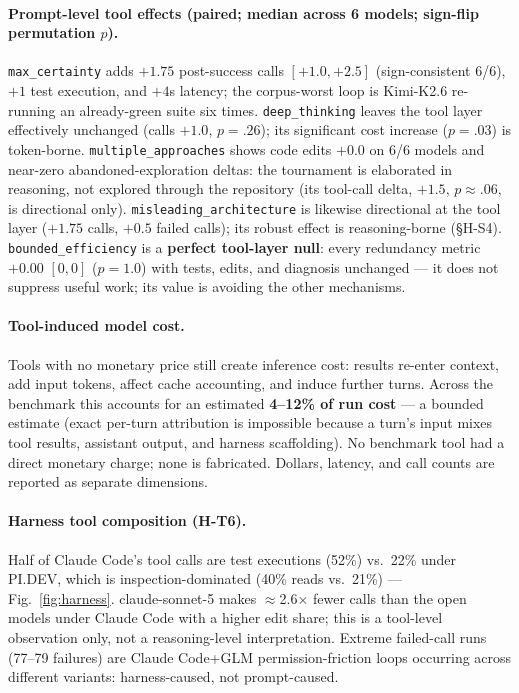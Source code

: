 \documentclass[11pt]{article}
\newcommand{\pidev}{PI.DEV}
\newcommand{\cc}{Claude Code}
\newcommand{\xd}{$\times$}
\begin{document}
\paragraph{Prompt-level tool effects (paired; median across 6 models;
sign-flip permutation $p$).} \texttt{max\_certainty} adds $+1.75$
post-success calls $[+1.0,+2.5]$ (sign-consistent 6/6), $+1$ test
execution, and $+4$s latency; the corpus-worst loop is Kimi-K2.6
re-running an already-green suite six times. \texttt{deep\_thinking}
leaves the tool layer effectively unchanged (calls $+1.0$, $p=.26$); its
significant cost increase ($p=.03$) is token-borne.
\texttt{multiple\_approaches} shows code edits $+0.0$ on 6/6 models and
near-zero abandoned-exploration deltas: the tournament is elaborated in
reasoning, not explored through the repository (its tool-call delta,
$+1.5$, $p\approx.06$, is directional only). \texttt{misleading\_architecture}
is likewise directional at the tool layer ($+1.75$ calls, $+0.5$ failed
calls); its robust effect is reasoning-borne (\S H-S4).
\texttt{bounded\_efficiency} is a \textbf{perfect tool-layer null}: every
redundancy metric $+0.00$ $[0,0]$ ($p=1.0$) with tests, edits, and
diagnosis unchanged --- it does not suppress useful work; its value is
avoiding the other mechanisms.

\paragraph{Tool-induced model cost.} Tools with no monetary price still
create inference cost: results re-enter context, add input tokens, affect
cache accounting, and induce further turns. Across the benchmark this
accounts for an estimated \textbf{4--12\% of run cost} --- a bounded
estimate (exact per-turn attribution is impossible because a turn's input
mixes tool results, assistant output, and harness scaffolding). No
benchmark tool had a direct monetary charge; none is fabricated. Dollars,
latency, and call counts are reported as separate dimensions.

\paragraph{Harness tool composition (H-T6).} Half of \cc{}'s tool calls
are test executions (52\%) vs.\ 22\% under \pidev{}, which is
inspection-dominated (40\% reads vs.\ 21\%) --- Fig.~\ref{fig:harness}.
claude-sonnet-5 makes $\approx$2.6\xd{} fewer calls than the open models
under \cc{} with a higher edit share; this is a tool-level observation
only, not a reasoning-level interpretation. Extreme failed-call runs
(77--79 failures) are \cc{}+GLM permission-friction loops occurring across
different variants: harness-caused, not prompt-caused.
\end{document}
